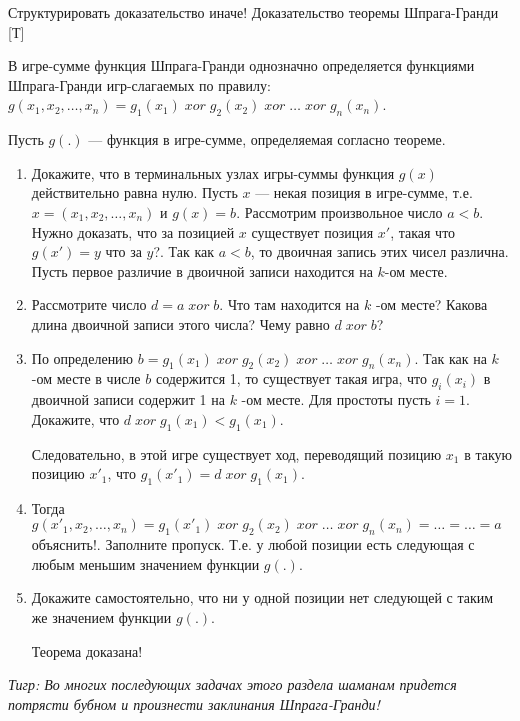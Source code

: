 \begin{problem} {\red  Структурировать доказательство иначе!}
 Доказательство теоремы Шпрага-Гранди [Т]\par
{}\par
В игре-сумме функция Шпрага-Гранди однозначно определяется функциями Шпрага-Гранди игр-слагаемых по правилу:  $g\left(x_{1},x_{2},\ldots,x_{n} \right)=g_{1} \left(x_{1} \right)\; xor\; g_{2} \left(x_{2} \right)\; xor\; \ldots \; xor\; g_{n} \left(x_{n} \right)$.
\par
Пусть  $g\left(.\right)$  --- функция в игре-сумме, определяемая согласно теореме.
\begin{enumerate}
\item 	Докажите, что в терминальных узлах игры-суммы функция  $g\left(x\right)$  действительно равна нулю.
Пусть  $x$  --- некая позиция в игре-сумме, т.е.  $x=\left(x_{1},x_{2},\ldots,x_{n} \right)$  и  $g\left(x\right)=b$. Рассмотрим произвольное число  $a<b$. Нужно доказать, что за позицией  $x$  существует позиция  $x'$, такая что  $g\left(x'\right)=y$ {\red что за $y$?}.
Так как  $a<b$, то двоичная запись этих чисел различна. Пусть первое различие в двоичной записи находится на  $k$-ом месте.\par
\item	Рассмотрите число  $d=a\; xor\; b$. Что там находится на  $k$ -ом месте? Какова длина двоичной записи этого числа? Чему равно  $d\; xor\; b$?
\item 	По определению  $b=g_{1} \left(x_{1} \right)\; xor\; g_{2} \left(x_{2} \right)\; xor\; \ldots \; xor\; g_{n} \left(x_{n} \right)$. Так как на  $k$ -ом месте в числе  $b$  содержится 1, то существует такая игра, что  $g_{i} \left(x_{i} \right)$  в двоичной записи содержит 1 на  $k$ -ом месте. Для простоты пусть  $i=1$. Докажите, что  $d\; xor\; g_{1} \left(x_{1} \right)<g_{1} \left(x_{1} \right)$.\par
Следовательно, в этой игре существует ход, переводящий позицию  $x_{1} $  в такую позицию $x'_{1} $, что  $g_{1} \left(x'_{1} \right)=d\; xor\; g_{1} \left(x_{1} \right)$.
\item	Тогда  $g\left(x'_{1},x_{2},\ldots,x_{n} \right)=g_{1} \left(x'_{1} \right)\; xor\; g_{2} \left(x_{2} \right)\; xor\; \ldots \; xor\; g_{n} \left(x_{n} \right)=\ldots =\ldots =a$ {\red объяснить!}. Заполните пропуск.
Т.е. у любой позиции есть следующая с любым меньшим значением функции  $g\left(.\right)$.\par
\item	Докажите самостоятельно, что ни у одной позиции нет следующей с таким же значением функции  $g\left(.\right)$.\par
Теорема доказана!\par
\end{enumerate}
{\it Тигр: Во многих последующих задачах этого раздела  шаманам придется потрясти бубном и произнести заклинания Шпрага-Гранди!}




\begin{sol}

\end{sol}
\end{problem}




